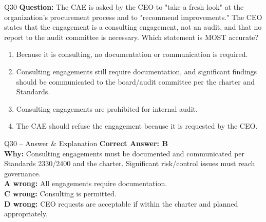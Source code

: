 \documentclass[aspectratio=169,10pt]{beamer}
\begin{document}
	\begin{frame}[t]{Q30}
		\small
		\textbf{Question:} The CAE is asked by the CEO to "take a fresh look" at the organization's procurement process and to "recommend improvements." The CEO states that the engagement is a consulting engagement, not an audit, and that no report to the audit committee is necessary. Which statement is MOST accurate?
		\begin{enumerate}[label=\Alph*.,itemsep=1pt,topsep=2pt]
			\item Because it is consulting, no documentation or communication is required.
			\item Consulting engagements still require documentation, and significant findings should be communicated to the board/audit committee per the charter and Standards.
			\item Consulting engagements are prohibited for internal audit.
			\item The CAE should refuse the engagement because it is requested by the CEO.
		\end{enumerate}
	\end{frame}
	
	\begin{frame}[t]{Q30 -- Answer \& Explanation}
		\small
		\textbf{Correct Answer: B} \\[4pt]
		\textbf{Why:} Consulting engagements must be documented and communicated per Standards 2330/2400 and the charter. Significant risk/control issues must reach governance. \\[4pt]
		\textbf{A wrong:} All engagements require documentation. \\[2pt]
		\textbf{C wrong:} Consulting is permitted. \\[2pt]
		\textbf{D wrong:} CEO requests are acceptable if within the charter and planned appropriately.
	\end{frame}
	
\end{document}
